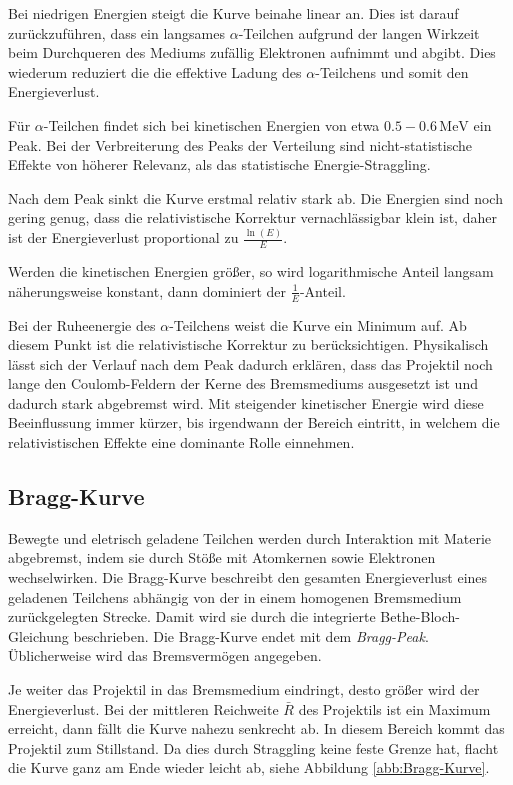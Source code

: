 \documentclass[12pt,a4paper]{scrartcl}
\numberwithin{equation}{section} %
\renewcommand{\[}{} %
\renewcommand{\]}{\noindent} %
\begin{document}
Bei niedrigen Energien steigt die Kurve beinahe linear an. Dies ist
darauf zurückzuführen, dass ein langsames \(\alpha\)-Teilchen aufgrund
der langen Wirkzeit beim Durchqueren des Mediums zufällig Elektronen
aufnimmt und abgibt. Dies wiederum reduziert die die effektive Ladung
des \(\alpha\)-Teilchens und somit den Energieverlust.

Für \(\alpha\)-Teilchen findet sich bei kinetischen Energien von etwa
\(0.5-0.6\mathrm{\,MeV}\) ein Peak. Bei der Verbreiterung des Peaks der
Verteilung sind nicht-statistische Effekte von höherer Relevanz, als das
statistische Energie-Straggling.

Nach dem Peak sinkt die Kurve erstmal relativ stark ab. Die Energien
sind noch gering genug, dass die relativistische Korrektur
vernachlässigbar klein ist, daher ist der Energieverlust proportional zu
\(\frac{\ln(E)}{E}\).

Werden die kinetischen Energien größer, so wird logarithmische Anteil
langsam näherungsweise konstant, dann dominiert der
\(\frac{1}{E}\)-Anteil.

Bei der Ruheenergie des \(\alpha\)-Teilchens weist die Kurve ein Minimum
auf. Ab diesem Punkt ist die relativistische Korrektur zu
berücksichtigen. Physikalisch lässt sich der Verlauf nach dem Peak
dadurch erklären, dass das Projektil noch lange den Coulomb-Feldern der
Kerne des Bremsmediums ausgesetzt ist und dadurch stark abgebremst wird.
Mit steigender kinetischer Energie wird diese Beeinflussung immer
kürzer, bis irgendwann der Bereich eintritt, in welchem die
relativistischen Effekte eine dominante Rolle einnehmen.

\hypertarget{bragg-kurve}{%
\subsection{Bragg-Kurve}\label{bragg-kurve}}

Bewegte und eletrisch geladene Teilchen werden durch Interaktion mit
Materie abgebremst, indem sie durch Stöße mit Atomkernen sowie
Elektronen wechselwirken. Die Bragg-Kurve beschreibt den gesamten
Energieverlust eines geladenen Teilchens abhängig von der in einem
homogenen Bremsmedium zurückgelegten Strecke. Damit wird sie durch die
integrierte Bethe-Bloch-Gleichung beschrieben. Die Bragg-Kurve endet mit
dem \emph{Bragg-Peak}. Üblicherweise wird das Bremsvermögen angegeben.

Je weiter das Projektil in das Bremsmedium eindringt, desto größer wird
der Energieverlust. Bei der mittleren Reichweite \(\bar R\) des
Projektils ist ein Maximum erreicht, dann fällt die Kurve nahezu
senkrecht ab. In diesem Bereich kommt das Projektil zum Stillstand. Da
dies durch Straggling keine feste Grenze hat, flacht die Kurve ganz am
Ende wieder leicht ab, siehe Abbildung \ref{abb:Bragg-Kurve}.
\end{document}
